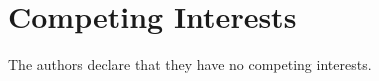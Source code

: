\documentclass[12pt]{article}
\begin{document}
\section*{Competing Interests}
The authors declare that they have no competing interests.






\end{document}
